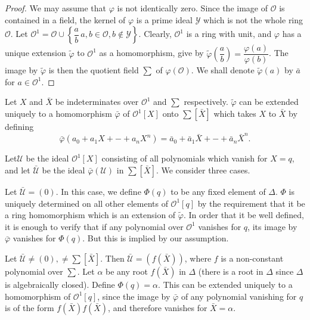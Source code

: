 \begin{proof}
  We may assume that $\varphi$ is not identically zero. Since the
  image of $\mathscr{O}$ is contained in a field, the kernel of
  $\varphi$ is a prime ideal $\mathscr{Y}$ which is not the whole ring
  $\mathscr{O}$. Let $\mathscr{O}^1 = \mathscr{O} \cup\left\{ \dfrac{a}{b}\, a, b
  \in \mathscr{O} , b \notin \mathscr{Y} \right\}$. Clearly, $\mathscr{O}^1$ is
  a ring with unit, and $\varphi$ has a unique extension
  $\tilde{\varphi}$ to $\mathscr{O}^1$ as a homomorphism, give by
  $\tilde{\varphi}\left(\dfrac{a}{b}\right) = \dfrac{\varphi
    (a)}{\varphi (b)}$. The image 
  by $\tilde{\varphi}$ is then the quotient field $\sum$ of $\varphi
  (\mathscr{O})$. We shall denote $\tilde{\varphi}(a)$ by $\bar{a}$
  for $a \in \mathscr{O}^1$. 
\end{proof}

Let $X$ and $\bar{X}$ be indeterminates over $\mathscr{O}^1$ and
$\sum$ respectively. $\tilde{\varphi}$ can be extended uniquely to a
homomorphism $\bar{\varphi}$ of $\mathscr{O}^1 [X]$ onto $\sum
[\bar{X}]$ which takes $X$ to $\bar{X}$ by defining	 
$$
\bar{\varphi} (a_0 + a_1 X + - + a_n X^n) = \bar {a}_0 + \bar{a}_1
\bar{X} + - + \bar{a}_n \bar{X}^n. 
$$

Let\pageoriginale $\mathscr{U}$ be the ideal $\mathscr{O}^1[X]$ consisting of all
polynomials which vanish for $X=q$, and let $\bar{\mathscr{U}}$ be the
ideal $\bar{\varphi}(\mathscr{U})$ in $\sum[\bar{X}]$. We consider
three cases. 

\setcounter{Case}{0}
\begin{Case} %
  Let $\bar{\mathscr{U}} = (0)$. In this case, we define $\Phi(q)$ to
  be any fixed element of $\Delta$. $\Phi$ is uniquely determined on
  all other elements of $\mathscr{O}^1[q]$ by the requirement that it
  be a ring homomorphism which is an extension of $\tilde{\varphi}$. In
  order that it be well defined, it is enough to verify that if any
  polynomial over $\mathscr{O}^1$ vanishes for $q$, its image by
  $\bar{\varphi}$ vanishes for $\Phi(q)$. But this is implied by our
  assumption. 
\end{Case}

\begin{Case} %
  Let $\bar{\mathscr{U}} \neq (0), \neq \sum [\bar{X}]$. Then
  $\bar{\mathscr{U}} = (f(\bar{X})) $, where $f$ is a non-constant
  polynomial over $\sum$. Let $\alpha$ be any root $f(\bar{X})$ in
  $\Delta$ (there is a root in $\Delta$ since $\Delta$ is
  algebraically closed). Define $\Phi(q) = \alpha$. This can be
  extended uniquely to a homomorphism of $\mathscr{O}^1[q]$, since the
  image by $\bar{\varphi}$ of any polynomial vanishing for $q$ is of
  the form $f (\bar{X})f(\bar{X})$, and therefore vanishes for
  $\bar{X} = \alpha$. 
\end{Case}

